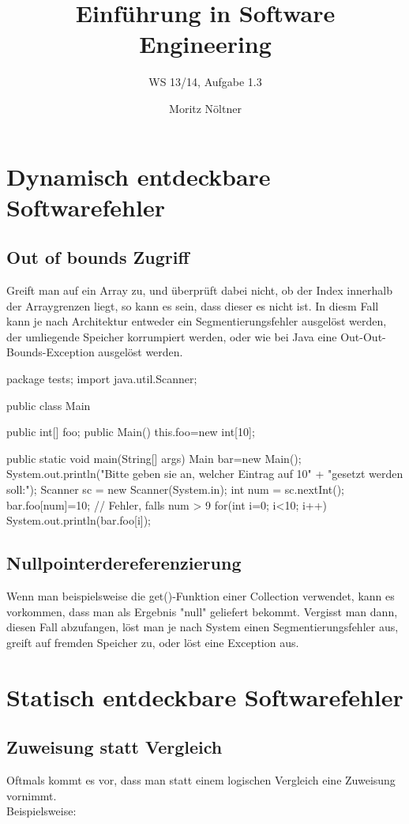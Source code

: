 \documentclass[ngerman]{scrartcl}
\begin{document}
\author{Moritz Nöltner}
\title{Einführung in Software Engineering}
\subtitle{WS 13/14, Aufgabe 1.3}
\maketitle


\section{Dynamisch entdeckbare Softwarefehler}
\subsection{Out of bounds Zugriff}
Greift man auf ein Array zu, und überprüft dabei nicht, ob der Index innerhalb der Arraygrenzen liegt, so kann es sein, dass dieser es nicht ist. In diesm Fall kann je nach Architektur entweder ein Segmentierungsfehler ausgelöst werden, der umliegende Speicher korrumpiert werden, oder wie bei Java eine Out-Out-Bounds-Exception ausgelöst werden.
\begin{Java}
package tests;
import java.util.Scanner;

public class Main {
	public int[] foo;
	public Main(){
		this.foo=new int[10];
	}

	public static void main(String[] args) {
		Main bar=new Main();
		System.out.println("Bitte geben sie an, welcher Eintrag auf 10"
			+ "gesetzt werden soll:");
		Scanner sc = new Scanner(System.in);
		int num = sc.nextInt();
		bar.foo[num]=10;	// Fehler, falls num > 9
		for(int i=0; i<10; i++)
		{
			System.out.println(bar.foo[i]);
		}
	}
}
\end{Java}


\subsection{Nullpointerdereferenzierung}
Wenn man beispielsweise die get()-Funktion einer Collection verwendet, kann es vorkommen, dass man als Ergebnis "null"  geliefert bekommt. Vergisst man dann, diesen Fall abzufangen, löst man je nach System einen Segmentierungsfehler aus, greift auf fremden Speicher zu, oder löst eine Exception aus.

\section{Statisch entdeckbare Softwarefehler}
\subsection{Zuweisung statt Vergleich}
Oftmals kommt es vor, dass man statt einem logischen Vergleich eine Zuweisung vornimmt.\\
Beispielsweise:\\
\begin{Java}
	...
	if(foo = bar) { // statt if(foo == bar) {
		// do something;
	}
	...
\end{Java}
\end{document}
